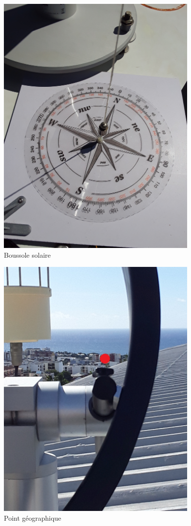 \documentclass[12pt,a4paper]{article}
\begin{document}
\begin{flushleft}
\begin{figure}[H]
\centering
\includegraphics[width=10cm, angle=-90]{image/montage/5.jpg} 
\caption{Boussole solaire}
\end{figure}

\begin{figure}[H]
\centering
\includegraphics[width=10cm]{image/montage/6.jpg} 
\caption{Point géographique}
\end{figure}


\end{flushleft}
\end{document}

